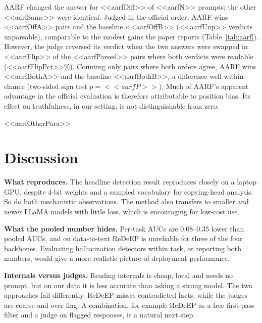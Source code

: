 \documentclass[conference]{IEEEtran}
\begin{document}
AARF changed the answer for <<aarfDiff>> of <<aarfN>> prompts; the other <<aarfSame>> were identical. Judged in the official order, AARF wins <<aarfOffA>> pairs and the baseline <<aarfOffB>> (<<aarfUnp>> verdicts unparsable), comparable to the modest gains the paper reports (Table~\ref{tab:aarf}). However, the judge reversed its verdict when the two answers were swapped in <<aarfFlip>> of the <<aarfParsed>> pairs where both verdicts were readable (<<aarfFlipPct>>\%). Counting only pairs where both orders agree, AARF wins <<aarfBothA>> and the baseline <<aarfBothB>>, a difference well within chance (two-sided sign test $p=<<aarfP>>$). Much of AARF's apparent advantage in the official evaluation is therefore attributable to position bias. Its effect on truthfulness, in our setting, is not distinguishable from zero.

<<aarfOtherPara>>

\section{Discussion}
\textbf{What reproduces.} The headline detection result reproduces closely on a laptop GPU, despite 4-bit weights and a sampled vocabulary for copying-head analysis. So do both mechanistic observations. The method also transfers to smaller and newer LLaMA models with little loss, which is encouraging for low-cost use.

\textbf{What the pooled number hides.} Per-task AUCs are 0.08--0.35 lower than pooled AUCs, and on data-to-text ReDeEP is unreliable for three of the four backbones. Evaluating hallucination detectors within task, or reporting both numbers, would give a more realistic picture of deployment performance.

\textbf{Internals versus judges.} Reading internals is cheap, local and needs no prompt, but on our data it is less accurate than asking a strong model. The two approaches fail differently. ReDeEP misses contradicted facts, while the judges are coarse and over-flag. A combination, for example ReDeEP as a free first-pass filter and a judge on flagged responses, is a natural next step.

\end{document}

